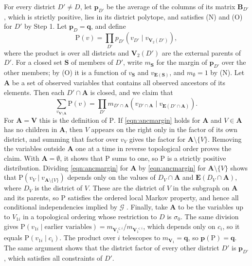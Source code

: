 \documentclass[12pt]{article}
\def\Pr{{\mathrm{P}}}
\newcommand{\bV}{\boldsymbol{V}}
\newcommand{\bS}{\boldsymbol{S}}
\begin{document}
For every district $D' \neq D$, let $\boldsymbol{p}_{D'}$ be the average of the columns of its matrix $\boldsymbol{B}_{D'}$, which is strictly positive, lies in its district polytope, and satisfies (N) and (O) for $D'$ by Step 1. Let $\boldsymbol{p}_D = \boldsymbol{q}$, and define
\[
\Pr(v) = \prod_{D'} p_{D'}(v_{D'} \mid v_{\bV_2(D')}),
\]
where the product is over all districts and $\bV_2(D')$ are the external parents of $D'$. For a closed set $\bS$ of members of $D'$, write $m_{\bS}$ for the margin of $\boldsymbol{p}_{D'}$ over the other members; by (O) it is a function of $v_{\bS}$ and $v_{\boldsymbol{E}(\bS)}$, and $m_\emptyset = 1$ by (N). Let $\boldsymbol{A}$ be a set of observed variables that contains all observed ancestors of its elements. Then each $D' \cap \boldsymbol{A}$ is closed, and we claim that
\begin{equation}
\sum_{v_{\bV \setminus \boldsymbol{A}}} \Pr(v) = \prod_{D'} m_{D' \cap \boldsymbol{A}}(v_{D' \cap \boldsymbol{A}} \mid v_{\boldsymbol{E}(D' \cap \boldsymbol{A})}). \label{eqn:ancmargin}
\end{equation}
For $\boldsymbol{A} = \bV$ this is the definition of $\Pr$. If \eqref{eqn:ancmargin} holds for $\boldsymbol{A}$ and $V \in \boldsymbol{A}$ has no children in $\boldsymbol{A}$, then $V$ appears on the right only in the factor of its own district, and summing that factor over $v_V$ gives the factor for $\boldsymbol{A} \setminus \{V\}$. Removing the variables outside $\boldsymbol{A}$ one at a time in reverse topological order proves the claim. With $\boldsymbol{A} = \emptyset$, it shows that $\Pr$ sums to one, so $\Pr$ is a strictly positive distribution. Dividing \eqref{eqn:ancmargin} for $\boldsymbol{A}$ by \eqref{eqn:ancmargin} for $\boldsymbol{A} \setminus \{V\}$ shows that $\Pr(v_V \mid v_{\boldsymbol{A} \setminus \{V\}})$ depends only on the values of $D_V \cap \boldsymbol{A}$ and $\boldsymbol{E}(D_V \cap \boldsymbol{A})$, where $D_V$ is the district of $V$. These are the district of $V$ in the subgraph on $\boldsymbol{A}$ and its parents, so $\Pr$ satisfies the ordered local Markov property, and hence all conditional independencies implied by $\mathcal{G}$ \citep{richardson2003admgs}. Finally, take $\boldsymbol{A}$ to be the variables up to $V_{1i}$ in a topological ordering whose restriction to $D$ is $\sigma_0$. The same division gives $\Pr(v_{1i} \mid \text{earlier variables}) = m_{\bV_1^{\leq i}} / m_{\bV_1^{< i}}$, which depends only on $c_i$, so it equals $\Pr(v_{1i} \mid c_i)$. The product over $i$ telescopes to $m_{\bV_1} = \boldsymbol{q}$, so $\boldsymbol{p}(\Pr) = \boldsymbol{q}$. The same argument shows that the district factor of every other district $D'$ is $\boldsymbol{p}_{D'}$, which satisfies all constraints of $D'$.
\end{document}
